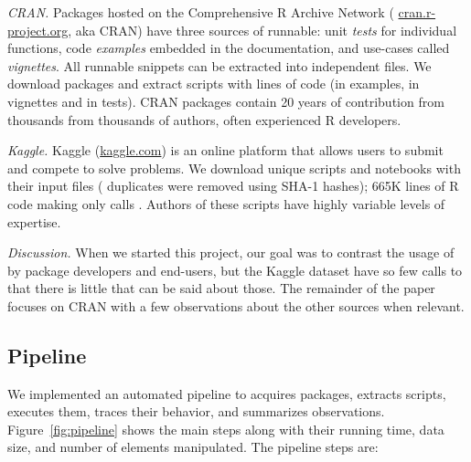 \documentclass[screen,acmsmall]{acmart}
\newcommand{\mypara}[1]{\medskip\noindent\emph{#1}\xspace}
\begin{document}
\mypara{CRAN.} Packages hosted on the Comprehensive R Archive Network ({\small
\url{cran.r-project.org}}, aka CRAN) have three sources of runnable: unit
\emph{tests} for individual functions, code \emph{examples} embedded in the
documentation, and use-cases called \emph{vignettes}. All runnable snippets
can be extracted into independent files. We download \CranPackages packages and
extract \CranRunnableScripts scripts with \CranRunnableCode lines of code
(\CranRunnableCodeExamplesRnd in examples, \CranRunnableCodeVignettesRnd in
vignettes and \CranRunnableCodeTestsRnd in tests). CRAN packages contain 20
years of contribution from thousands from thousands of authors, often
experienced R developers.

\mypara{Kaggle.} Kaggle ({\small \url{kaggle.com}}) is an online platform that
allows users to submit and compete to solve problems. We download \KaggleUnique
unique scripts and notebooks with their input files (\KaggleDuplicates
duplicates were removed using SHA-1 hashes); 665K lines of R code making only
\KaggleWithEvals calls \eval. Authors of these scripts have highly variable
levels of expertise.

\mypara{Discussion.} When we started this project, our goal was to contrast the
usage of \eval by package developers and end-users, but the Kaggle dataset have
so few calls to \eval that there is little that can be said about those. The
remainder of the paper focuses on CRAN with a few observations about the other
sources when relevant.


\subsection{Pipeline}

We implemented an automated pipeline to acquires packages, extracts scripts,
executes them, traces their behavior, and summarizes observations.
Figure~\ref{fig:pipeline} shows the main steps along with their running time,
data size, and number of elements manipulated. The pipeline steps are:
\end{document}
